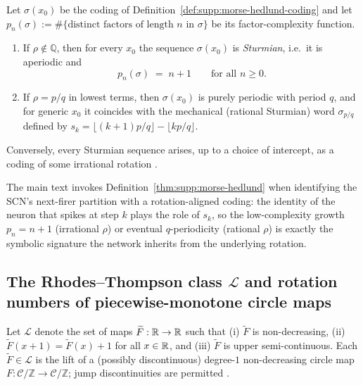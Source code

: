 \begin{theorem}\label{thm:supp:morse-hedlund}
Let $\sigma(x_0)$ be the coding of Definition~\ref{def:supp:morse-hedlund-coding} and let $p_n(\sigma):=\#\{\text{distinct factors of length }n\text{ in }\sigma\}$ be its factor-complexity function.
\begin{enumerate}[leftmargin=1.5em,itemsep=2pt]
    \item If $\rho\notin\mathbb{Q}$, then for every $x_0$ the sequence $\sigma(x_0)$ is \emph{Sturmian}, i.e.\ it is aperiodic and
    \[
        p_n(\sigma)\;=\;n+1\qquad\text{for all } n\ge 0.
    \]
    \item If $\rho=p/q$ in lowest terms, then $\sigma(x_0)$ is purely periodic with period $q$, and for generic $x_0$ it coincides with the mechanical (rational Sturmian) word $\sigma_{p/q}$ defined by $s_k=\lfloor (k+1)p/q\rfloor-\lfloor kp/q\rfloor$.
\end{enumerate}
Conversely, every Sturmian sequence arises, up to a choice of intercept, as a coding of some irrational rotation \citep{morse1938symbolic,morse1940symbolic,lothaire2002algebraic}.
\end{theorem}

\begin{remark}
The main text invokes Definition~\ref{thm:supp:morse-hedlund} when identifying the SCN's next-firer partition with a rotation-aligned coding: the identity of the neuron that spikes at step $k$ plays the role of $s_k$, so the low-complexity growth $p_n=n+1$ (irrational $\rho$) or eventual $q$-periodicity (rational $\rho$) is exactly the symbolic signature the network inherits from the underlying rotation.
\end{remark}

\subsection{The Rhodes--Thompson class $\mathcal{L}$ and rotation numbers of piecewise-monotone circle maps}
\label{sec:supp:rhodes-thompson}

\begin{definition}\label{def:rhodes-thompson-class}
Let $\mathcal{L}$ denote the set of maps $\widetilde F:\mathbb{R}\to\mathbb{R}$ such that (i) $\widetilde F$ is non-decreasing, (ii) $\widetilde F(x+1)=\widetilde F(x)+1$ for all $x\in\mathbb{R}$, and (iii) $\widetilde F$ is upper semi-continuous. Each $\widetilde F\in\mathcal{L}$ is the lift of a (possibly discontinuous) degree-$1$ non-decreasing circle map $F:\mathcal{C}/\mathbb{Z}\to\mathcal{C}/\mathbb{Z}$; jump discontinuities are permitted \citep{rhodes1991topologies}.
\end{definition}

